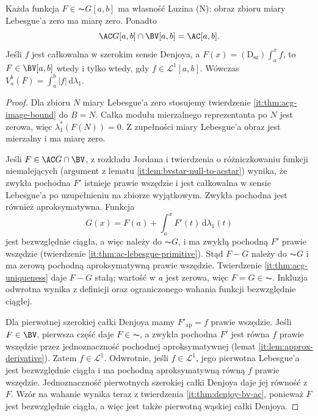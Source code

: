 \begin{wniosek}\label{it:cor:acg-bv}
Każda funkcja $F\in\AC G[a,b]$ ma własność Luzina (N): obraz zbioru miary Lebesgue'a zero ma miarę zero. Ponadto
\[
 \AC G[a,b]\cap\BV[a,b]=\AC[a,b].
\]
Jeśli $f$ jest całkowalna w szerokim sensie Denjoya, a $F(x)=(\mathrm D_{\mathrm{sz}})\int_a^x f$, to $F\in\BV[a,b]$ wtedy i tylko wtedy, gdy $f\in\mathcal L^1[a,b]$. Wówczas $V_a^b(F)=\int_a^b|f|\,\mathrm d\lambda_1$.
\end{wniosek}
\begin{proof}
Dla zbioru $N$ miary Lebesgue'a zero stosujemy twierdzenie
\ref{it:thm:acg-image-bound} do $B=N$. Całka modułu
mierzalnego reprezentanta po $N$ jest zerowa, więc
$\lambda_1^*(F(N))=0$. Z zupełności miary Lebesgue'a
obraz jest mierzalny i ma miarę zero.

Jeśli $F\in\AC G\cap\BV$, z rozkładu Jordana i twierdzenia o różniczkowaniu funkcji niemalejących (argument z lematu \ref{it:lem:bvstar-null-to-acstar}) wynika, że zwykła pochodna $F'$ istnieje prawie wszędzie i jest całkowalna w sensie Lebesgue'a po uzupełnieniu na zbiorze wyjątkowym. Zwykła pochodna jest również aproksymatywna. Funkcja
\[
 G(x)=F(a)+\int_a^x F'(t)\,\mathrm d\lambda_1(t)
\]
jest bezwzględnie ciągła, a więc należy do $\AC G$, i ma zwykłą pochodną $F'$ prawie wszędzie (twierdzenie \ref{it:thm:ac-lebesgue-primitive}). Stąd $F-G$ należy do $\AC G$ i ma zerową pochodną aproksymatywną prawie wszędzie. Twierdzenie \ref{it:thm:acg-uniqueness} daje $F-G$ stałą; wartość w $a$ jest zerowa, więc $F=G\in\AC$. Inkluzja odwrotna wynika z definicji oraz ograniczonego wahania funkcji bezwzględnie ciągłej.

Dla pierwotnej szerokiej całki Denjoya mamy $F'_{\mathrm{ap}}=f$ prawie wszędzie. Jeśli $F\in\BV$, pierwsza część daje $F\in\AC$, a zwykła pochodna $F'$ jest równa $f$ prawie wszędzie przez jednoznaczność pochodnej aproksymatywnej (lemat \ref{it:lem:approx-derivative}). Zatem $f\in\mathcal L^1$. Odwrotnie, jeśli $f\in\mathcal L^1$, jego pierwotna Lebesgue'a jest bezwzględnie ciągła i ma pochodną aproksymatywną równą $f$ prawie wszędzie. Jednoznaczność pierwotnych szerokiej całki Denjoya daje jej równość z $F$. Wzór na wahanie wynika teraz z twierdzenia \ref{it:thm:denjoy-bv-ac}, ponieważ $F$ jest bezwzględnie ciągła, a więc jest także pierwotną wąskiej całki Denjoya.
\end{proof}

